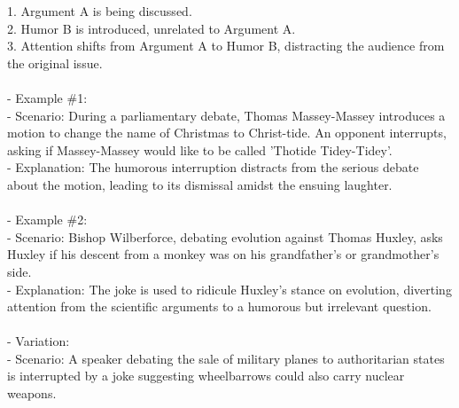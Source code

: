 \documentclass[a4paper,12pt,single,pdftex]{scrbook}
\begin{document}
    
        1. Argument A is being discussed.
    \\

    
        2. Humor B is introduced, unrelated to Argument A.
    \\

    
        3. Attention shifts from Argument A to Humor B, distracting the audience from the original issue.
    \\

    
      
    \\

    
      - Example \#1:
    \\

    
        - Scenario: During a parliamentary debate, Thomas Massey-Massey introduces a motion to change the name of Christmas to Christ-tide. An opponent interrupts, asking if Massey-Massey would like to be called 'Thotide Tidey-Tidey'.
    \\

    
        - Explanation: The humorous interruption distracts from the serious debate about the motion, leading to its dismissal amidst the ensuing laughter.
    \\

    
      
    \\

    
      - Example \#2:
    \\

    
        - Scenario: Bishop Wilberforce, debating evolution against Thomas Huxley, asks Huxley if his descent from a monkey was on his grandfather’s or grandmother’s side.
    \\

    
        - Explanation: The joke is used to ridicule Huxley's stance on evolution, diverting attention from the scientific arguments to a humorous but irrelevant question.
    \\

    
      
    \\

    
      - Variation:
    \\

    
        - Scenario: A speaker debating the sale of military planes to authoritarian states is interrupted by a joke suggesting wheelbarrows could also carry nuclear weapons.
    \\
\end{document}
